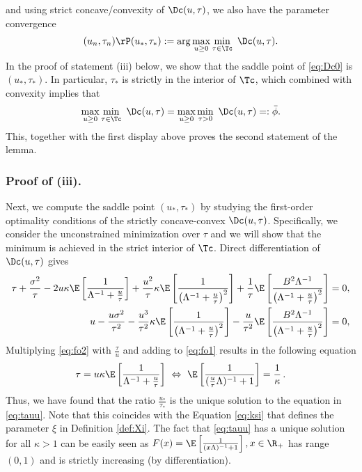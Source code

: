 and {using strict concave/convexity of $\Dc(u,\tau)$, we also have the parameter convergence \cite[Lem. 7.75]{NF36}}
\begin{align}\label{eq:Dc}
{(u_n,\tau_n) \rP (u_*,\tau_*):=\arg\max_{u\geq 0}\min_{\tau\in\Tc}~ \Dc(u,\tau).}
\end{align}
In the proof of statement (iii) below, we show that the saddle point of \eqref{eq:Dc0} is $(u_*,\tau_*)$. In particular, $\tau_*$ is strictly in the interior of $\Tc$, which combined with convexity implies that
$$
 \max_{u\geq 0}\min_{\tau\in\Tc}~ \Dc(u,\tau) =  \max_{u\geq 0}\min_{\tau>0}~ \Dc(u,\tau) =: \bar\phi.
$$
This, together with the first display above proves the second statement of the lemma.

\vspace{5pt}
\subsubsection{Proof of (iii).}  Next, we compute the saddle point $(u_*,\tau_*)$ by studying the first-order optimality conditions of the strictly concave-convex $\Dc(u,\tau)$. Specifically, we consider the unconstrained minimization over $\tau$ and we will show that the minimum is achieved in the strict interior of $\Tc$. Direct differentiation of $\Dc(u,\tau)$ gives
\begin{subequations}
\begin{align}
{\tau} + \frac{\sigma^2}{\tau} - 2u\kappa\E\left[ \frac{1}{\Lambda^{-1}+\frac{u}{\tau}} \right] + \frac{u^2}{\tau}\kappa \E\left[ \frac{1}{\left(\Lambda^{-1}+\frac{u}{\tau}\right)^2}\right] + \frac{1}{\tau}\E\left[\frac{B^2\Lambda^{-1}}{\left(\Lambda^{-1}+\frac{u}{\tau}\right)^2}\right] &= 0, \label{eq:fo1}\\
{u} - \frac{u\sigma^2}{\tau^2} - \frac{u^3}{\tau^2}\kappa \E\left[ \frac{1}{\left(\Lambda^{-1} + \frac{u}{\tau}\right)^2}\right] - \frac{u}{\tau^2} \E\left[\frac{B^2\Lambda^{-1}}{\left(\Lambda^{-1}+\frac{u}{\tau}\right)^2}\right] &= 0,\label{eq:fo2}
\end{align}
\end{subequations}
Multiplying \eqref{eq:fo2}  with $\frac{\tau}{u}$ and adding to \eqref{eq:fo1} results in the following equation
\begin{align}
\tau = u\kappa\E\left[ \frac{1}{\Lambda^{-1}+\frac{u}{\tau}} \right] ~\Leftrightarrow ~
\E\left[ \frac{1}{(\frac{u}{\tau}\Lambda)^{-1}+1} \right] = \frac{1}{\kappa} \label{eq:tauu}\,.
\end{align}
Thus, we have found that the ratio $\frac{u_*}{\tau_*}$ is the unique solution to the equation in \eqref{eq:tauu}. Note that this coincides with the Equation \eqref{eq:ksi} that defines the parameter $\xi$ in Definition \ref{def:Xi}.  The fact that \eqref{eq:tauu} has a unique solution for all $\kappa>1$ can be easily seen as $F(x)=\E\left[ \frac{1}{(x\Lambda)^{-1}+1} \right], x\in\R_+$ has range $(0,1)$ and is strictly increasing (by differentiation). 


